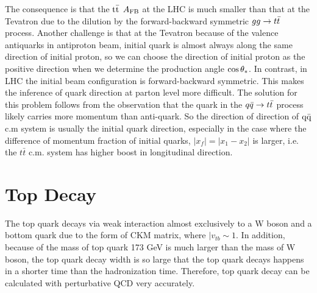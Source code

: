 The consequence is that the $\mathrm{t}\bar{\mathrm{t}}$ $A_{\mathrm{FB}}$ at the LHC is much smaller than that at the Tevatron due to the dilution by the forward-backward symmetric $gg \rightarrow t \bar t$ process. Another challenge is that at the Tevatron because of the valence antiquarks in antiproton beam, initial quark is almost always along the same direction of initial proton, so we can choose the direction of initial proton as the positive direction when we determine the production angle $\cos\theta_*$. In contrast, in LHC the initial beam configuration is forward-backward symmetric. This makes the inference of quark direction at parton level more difficult. The solution for this problem follows from the observation that the quark in the $q\bar q \rightarrow t \bar t$ process likely carries more momentum than anti-quark. So the direction of direction of $\mathrm{q \bar{q}}$ c.m system is usually the initial quark direction, especially in the case where the difference of momentum fraction of initial quarks, $|x_f| = |x_1-x_2|$ is larger, i.e. the $t\bar t$ c.m. system has higher boost in longitudinal direction.  

\section{Top Decay}
\label{sec:Decay}
 
The top quark decays via weak interaction almost exclusively to a W boson and a bottom quark due to the form of CKM matrix, where $|v_{tb}\sim1$. In addition, because of the mass of top quark 173 GeV is much larger than the mass of W boson, the top quark decay width is so large that the top quark decays happens in a shorter time than the hadronization time. Therefore, top quark decay can be calculated with perturbative QCD very accurately.
 
